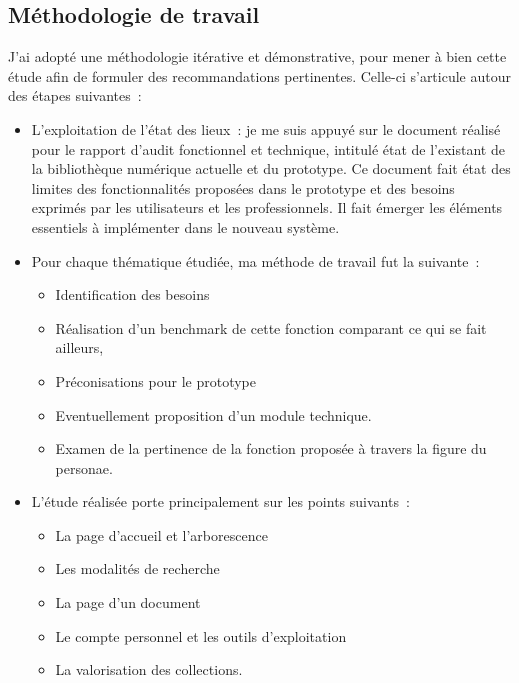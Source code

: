 \subsection{Méthodologie de travail}
J’ai adopté une méthodologie itérative et démonstrative, pour mener à bien cette étude afin de formuler des recommandations pertinentes. Celle-ci s’articule autour des étapes suivantes :
\begin{itemize}
	\item L’exploitation de l’état des lieux : je me suis appuyé sur le document réalisé pour le rapport d’audit fonctionnel et technique, intitulé état de l’existant de la bibliothèque numérique actuelle et du prototype. Ce document fait état des limites des fonctionnalités proposées dans le prototype et des besoins exprimés par les utilisateurs et les professionnels. Il fait émerger les éléments essentiels à implémenter dans le nouveau système. 
\item Pour chaque thématique étudiée, ma méthode de travail fut la suivante : 
\begin{itemize}
	\item Identification des besoins
\item Réalisation d’un benchmark de cette fonction comparant ce qui se fait ailleurs, 
\item Préconisations pour le prototype
\item Eventuellement proposition d’un module technique. 
\item Examen de la pertinence de la fonction proposée à travers la figure du personae. 
\end{itemize}
\item L’étude réalisée porte principalement sur les points suivants :
\begin{itemize}
	\item La page d’accueil et l’arborescence
\item Les modalités de recherche
\item La page d’un document 
\item Le compte personnel et les outils d’exploitation
\item La valorisation des collections.
\end{itemize}
\end{itemize}
 
